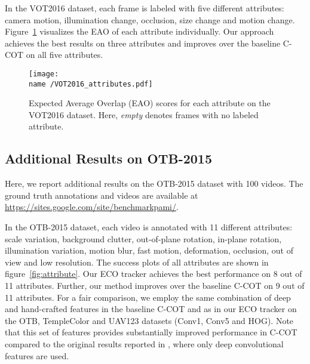 \documentclass[10pt,twocolumn,letterpaper]{article}
\begin{document}
In the VOT2016 dataset, each frame is labeled with five different attributes: camera motion, illumination change, occlusion, size change and motion change. Figure~\ref{fig:VOT_attribute} visualizes the EAO of each attribute individually. Our approach achieves the best results on three attributes and improves over the baseline C-COT \cite{DanelljanECCV2016} on all five attributes.

\begin{figure}[!t]
	\centering
	\newcommand{\wid}{\columnwidth}
	\newcommand{\name}{figures/sota_VOT}
	\texttt{[image: \\name /VOT2016\_attributes.pdf]}\caption{Expected Average Overlap (EAO) scores for each attribute on the VOT2016 dataset. Here, \emph{empty} denotes frames with no labeled attribute.}
	\label{fig:VOT_attribute}
\end{figure}

\subsection*{Additional Results on OTB-2015}
\label{sec:supp_OTB}
Here, we report additional results on the OTB-2015 dataset \cite{OTB2015} with 100 videos. The ground truth annotations and videos are available at \url{https://sites.google.com/site/benchmarkpami/}.

In the OTB-2015 dataset, each video is annotated with 11 different attributes: scale variation, background clutter, out-of-plane rotation, in-plane rotation, illumination variation, motion blur, fast motion, deformation, occlusion, out of view and low resolution. The success plots of all attributes are shown in figure~\ref{fig:attribute}. Our ECO tracker achieves the best performance on 8 out of 11 attributes. Further, our method improves over the baseline C-COT \cite{DanelljanECCV2016} on 9 out of 11 attributes. For a fair comparison, we employ the same combination of deep and hand-crafted features in the baseline C-COT and as in our ECO tracker on the OTB, TempleColor and UAV123 datasets (Conv1, Conv5 and HOG). Note that this set of features provides substantially improved performance in C-COT compared to the original results reported in \cite{DanelljanECCV2016}, where only deep convolutional features are used.
\end{document}
